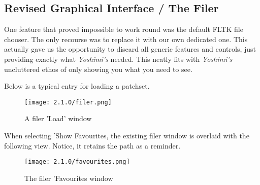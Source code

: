 \subsection{Revised Graphical Interface / The Filer}
\label{subsec:interface_filer}
   One feature that proved impossible to work round was the default FLTK file
   chooser. The only recourse was to replace it with our own dedicated one. This
   actually gave us the opportunity to discard all generic features and controls,
   just providing exactly what \textsl{Yoshimi's} needed. This neatly fits with
   \textsl{Yoshimi's} uncluttered ethos of only showing you what you need to see.

   Below is a typical entry for loading a patchset.
\begin{figure}[H]
   \centering
   \texttt{[image: 2.1.0/filer.png]}
   \caption{A filer 'Load' window}
   \label{fig:filer_load_window}
\end{figure}

When selecting 'Show Favourites, the existing filer window is overlaid with the
following view. Notice, it retains the path as a reminder.
\begin{figure}[H]
   \centering
   \texttt{[image: 2.1.0/favourites.png]}
   \caption{The filer 'Favourites window}
   \label{fig:filer_favourites_window}
\end{figure}

